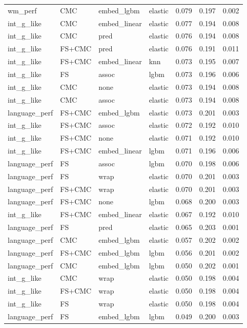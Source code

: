 \documentclass{article}
\begin{document}
\begin{longtable}{llllrrr}
	wm\_perf & CMC & embed\_lgbm & elastic & 0.079 & 0.197 & 0.002 \\
	int\_g\_like & CMC & embed\_linear & elastic & 0.077 & 0.194 & 0.008 \\
	int\_g\_like & CMC & pred & elastic & 0.076 & 0.194 & 0.008 \\
	int\_g\_like & FS+CMC & pred & elastic & 0.076 & 0.191 & 0.011 \\
	int\_g\_like & FS+CMC & embed\_linear & knn & 0.073 & 0.195 & 0.007 \\
	int\_g\_like & FS & assoc & lgbm & 0.073 & 0.196 & 0.006 \\
	int\_g\_like & CMC & none & elastic & 0.073 & 0.194 & 0.008 \\
	int\_g\_like & CMC & assoc & elastic & 0.073 & 0.194 & 0.008 \\
	language\_perf & FS+CMC & embed\_lgbm & elastic & 0.073 & 0.201 & 0.003 \\
	int\_g\_like & FS+CMC & assoc & elastic & 0.072 & 0.192 & 0.010 \\
	int\_g\_like & FS+CMC & none & elastic & 0.071 & 0.192 & 0.010 \\
	int\_g\_like & FS+CMC & embed\_linear & lgbm & 0.071 & 0.196 & 0.006 \\
	language\_perf & FS & assoc & lgbm & 0.070 & 0.198 & 0.006 \\
	language\_perf & FS & wrap & elastic & 0.070 & 0.201 & 0.003 \\
	language\_perf & FS+CMC & wrap & elastic & 0.070 & 0.201 & 0.003 \\
	language\_perf & FS+CMC & none & lgbm & 0.068 & 0.200 & 0.003 \\
	int\_g\_like & FS+CMC & embed\_linear & elastic & 0.067 & 0.192 & 0.010 \\
	language\_perf & FS & pred & elastic & 0.065 & 0.203 & 0.001 \\
	language\_perf & CMC & embed\_lgbm & elastic & 0.057 & 0.202 & 0.002 \\
	language\_perf & FS+CMC & embed\_lgbm & lgbm & 0.056 & 0.201 & 0.002 \\
	language\_perf & CMC & embed\_lgbm & lgbm & 0.050 & 0.202 & 0.001 \\
	int\_g\_like & CMC & wrap & elastic & 0.050 & 0.198 & 0.004 \\
	int\_g\_like & FS+CMC & wrap & elastic & 0.050 & 0.198 & 0.004 \\
	int\_g\_like & FS & wrap & elastic & 0.050 & 0.198 & 0.004 \\
	language\_perf & FS & embed\_lgbm & lgbm & 0.049 & 0.200 & 0.003 \\

\end{longtable}
\end{document}
